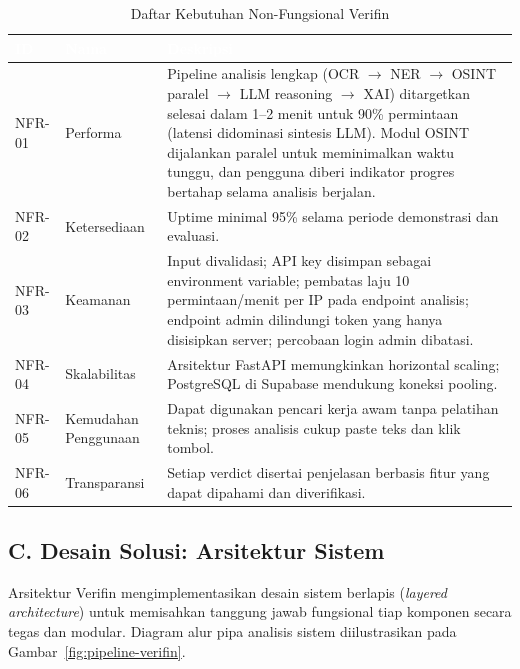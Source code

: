 \documentclass[12pt,a4paper]{article}
\newcommand{\thead}[1]{\textcolor{white}{\textbf{#1}}}
\begin{document}
\begin{table}[H]
\centering
\caption{Daftar Kebutuhan Non-Fungsional Verifin}
\label{tab:nfr-list}
\small
\begin{tabularx}{\linewidth}{|L{1.5cm}|L{3.2cm}|Y|}
\hline
{}\thead{ID} & \thead{Nama} & \thead{Deskripsi} \\
\hline
{}
NFR-01 & Performa & Pipeline analisis lengkap (OCR $\to$ NER $\to$ OSINT paralel $\to$ LLM reasoning $\to$ XAI) ditargetkan selesai dalam 1--2 menit untuk 90\% permintaan (latensi didominasi sintesis LLM). Modul OSINT dijalankan paralel untuk meminimalkan waktu tunggu, dan pengguna diberi indikator progres bertahap selama analisis berjalan. \\ \hline
NFR-02 & Ketersediaan & Uptime minimal 95\% selama periode demonstrasi dan evaluasi. \\ \hline
{}
NFR-03 & Keamanan & Input divalidasi; API key disimpan sebagai environment variable; pembatas laju 10 permintaan/menit per IP pada endpoint analisis; endpoint admin dilindungi token yang hanya disisipkan server; percobaan login admin dibatasi. \\ \hline
NFR-04 & Skalabilitas & Arsitektur FastAPI memungkinkan horizontal scaling; PostgreSQL di Supabase mendukung koneksi pooling. \\ \hline
{}
NFR-05 & Kemudahan Penggunaan & Dapat digunakan pencari kerja awam tanpa pelatihan teknis; proses analisis cukup paste teks dan klik tombol. \\ \hline
NFR-06 & Transparansi & Setiap verdict disertai penjelasan berbasis fitur yang dapat dipahami dan diverifikasi. \\ \hline
\end{tabularx}
\end{table}

\subsection*{C. Desain Solusi: Arsitektur Sistem}

Arsitektur Verifin mengimplementasikan desain sistem berlapis (\textit{layered architecture})
untuk memisahkan tanggung jawab fungsional tiap komponen secara tegas dan modular. Diagram
alur pipa analisis sistem diilustrasikan pada Gambar~\ref{fig:pipeline-verifin}.

\vspace{0.1cm}
\end{document}
